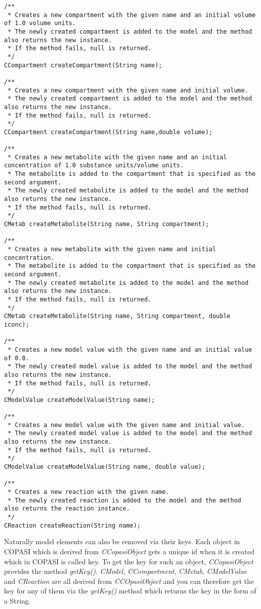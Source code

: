 \documentclass[a4,12pt]{article}
\begin{document}
\begin{lstlisting}
/**
 * Creates a new compartment with the given name and an initial volume of 1.0 volume units.
 * The newly created compartment is added to the model and the method also returns the new instance.
 * If the method fails, null is returned.
 */
CCompartment createCompartment(String name);

/**
 * Creates a new compartment with the given name and initial volume.
 * The newly created compartment is added to the model and the method also returns the new instance.
 * If the method fails, null is returned.
 */
CCompartment createCompartment(String name,double volume);

/**
 * Creates a new metabolite with the given name and an initial concentration of 1.0 substance units/volume units.
 * The metabolite is added to the compartment that is specified as the second argument.
 * The newly created metabolite is added to the model and the method also returns the new instance.
 * If the method fails, null is returned.
 */
CMetab createMetabolite(String name, String compartment);

/**
 * Creates a new metabolite with the given name and initial concentration.
 * The metabolite is added to the compartment that is specified as the second argument.
 * The newly created metabolite is added to the model and the method also returns the new instance.
 * If the method fails, null is returned.
 */
CMetab createMetabolite(String name, String compartment, double iconc);

/**
 * Creates a new model value with the given name and an initial value of 0.0.
 * The newly created model value is added to the model and the method also returns the new instance.
 * If the method fails, null is returned.
 */
CModelValue createModelValue(String name);

/**
 * Creates a new model value with the given name and initial value.
 * The newly created model value is added to the model and the method also returns the new instance.
 * If the method fails, null is returned.
 */
CModelValue createModelValue(String name, double value);

/**
 * Creates a new reaction with the given name.
 * The newly created reaction is added to the model and the method also returns the reaction instance.
 */
CReaction createReaction(String name);
\end{lstlisting}

Naturally model elements can also be removed via their keys. Each object in COPASI which is derived from \textit{CCopasiObject} gets a unique id when it is created which in COPASI is called key. To get the key for such an object, \textit{CCopasiObject} provides the method \textit{getKey()}.
\textit{CModel}, \textit{CCompartment}, \textit{CMetab}, \textit{CModelValue} and \textit{CReaction} are all derived from \textit{CCOpasiObject} and you can therefore get the key for any of them via the \textit{getKey()} method which returns the key in the form of a String.
\end{document}
